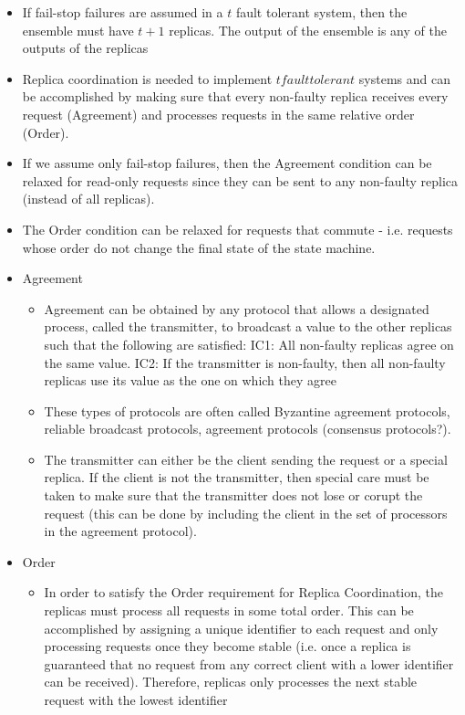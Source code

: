 \documentclass[a4paper]{article}
\begin{document}
\begin{itemize}
\begin{itemize}
\item If fail-stop failures are assumed in a $t$ fault tolerant system, then the ensemble must have $t+1$ replicas. The output of the ensemble is any of the outputs of the replicas

\item Replica coordination is needed to implement $t fault tolerant$ systems and can be accomplished by making sure that every non-faulty replica receives every request (Agreement) and processes requests in the same relative order (Order).

\item If we assume only fail-stop failures, then the Agreement condition can be relaxed for read-only requests since they can be sent to any non-faulty replica (instead of all replicas).

\item The Order condition can be relaxed for requests that commute - i.e. requests whose order do not change the final state of the state machine.

\item Agreement
\begin{itemize}

\item Agreement can be obtained by any protocol that allows a designated process, called the transmitter, to broadcast a value to the other replicas such that the following are satisfied: IC1: All non-faulty replicas agree on the same value. IC2: If the transmitter is non-faulty, then all non-faulty replicas use its value as the one on which they agree

\item These types of protocols are often called Byzantine agreement protocols, reliable broadcast protocols, agreement protocols (consensus protocols?).

\item The transmitter can either be the client sending the request or a special replica. If the client is not the transmitter, then special care must be taken to make sure that the transmitter does not lose or corupt the request (this can be done by including the client in the set of processors in the agreement protocol).


\end{itemize}

\item Order
\begin{itemize}
\item In order to satisfy the Order requirement for Replica Coordination, the replicas must process all requests in some total order. This can be accomplished by assigning a unique identifier to each request and only processing requests once they become stable (i.e. once a replica is guaranteed that no request from any correct client with a lower identifier can be received). Therefore, replicas only processes the next stable request with the lowest identifier


\end{itemize}
\end{itemize}
\end{itemize}
\end{document}
